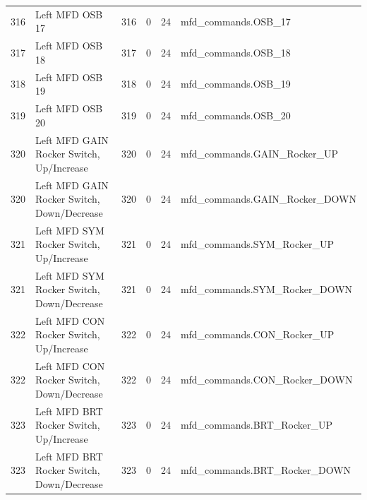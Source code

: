 \documentclass[10pt,a4paper]{article}
\begin{document}
\begin{longtable}{>{\ttfamily\small}p{38mm} >{\small}p{72mm} r r r >{\ttfamily\small}p{48mm}}
\rowcolor{rowodd}
  316 & Left MFD OSB 17 & 316 & 0 & 24 & mfd\_commands.OSB\_17 \\
  317 & Left MFD OSB 18 & 317 & 0 & 24 & mfd\_commands.OSB\_18 \\
\rowcolor{rowodd}
  318 & Left MFD OSB 19 & 318 & 0 & 24 & mfd\_commands.OSB\_19 \\
  319 & Left MFD OSB 20 & 319 & 0 & 24 & mfd\_commands.OSB\_20 \\
\rowcolor{rowodd}
  320 & Left MFD GAIN Rocker Switch, Up/Increase & 320 & 0 & 24 & mfd\_commands.GAIN\_Rocker\_UP \\
  320 & Left MFD GAIN Rocker Switch, Down/Decrease & 320 & 0 & 24 & mfd\_commands.GAIN\_Rocker\_DOWN \\
\rowcolor{rowodd}
  321 & Left MFD SYM Rocker Switch, Up/Increase & 321 & 0 & 24 & mfd\_commands.SYM\_Rocker\_UP \\
  321 & Left MFD SYM Rocker Switch, Down/Decrease & 321 & 0 & 24 & mfd\_commands.SYM\_Rocker\_DOWN \\
\rowcolor{rowodd}
  322 & Left MFD CON Rocker Switch, Up/Increase & 322 & 0 & 24 & mfd\_commands.CON\_Rocker\_UP \\
  322 & Left MFD CON Rocker Switch, Down/Decrease & 322 & 0 & 24 & mfd\_commands.CON\_Rocker\_DOWN \\
\rowcolor{rowodd}
  323 & Left MFD BRT Rocker Switch, Up/Increase & 323 & 0 & 24 & mfd\_commands.BRT\_Rocker\_UP \\
  323 & Left MFD BRT Rocker Switch, Down/Decrease & 323 & 0 & 24 & mfd\_commands.BRT\_Rocker\_DOWN \\
\end{longtable}
\end{document}
